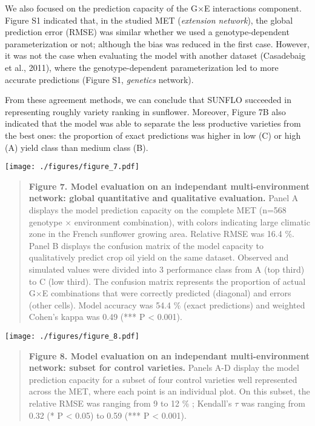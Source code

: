 \documentclass[a4paper]{article}
\begin{document}
We also focused on the prediction capacity of the G\(\times\)E
interactions component. Figure S1 indicated that, in the studied MET
(\emph{extension network}), the global prediction error (RMSE) was
similar whether we used a genotype-dependent parameterization or not;
although the bias was reduced in the first case. However, it was not the
case when evaluating the model with another dataset (Casadebaig et al.,
2011), where the genotype-dependent parameterization led to more
accurate predictions (Figure S1, \emph{genetics} network).

From these agreement methods, we can conclude that SUNFLO succeeded in
representing roughly variety ranking in sunflower. Moreover, Figure 7B
also indicated that the model was able to separate the less productive
varieties from the best ones: the proportion of exact predictions was
higher in low (C) or high (A) yield class than medium class (B).

\texttt{[image: ./figures/figure\_7.pdf]}

\begin{quote}
\textbf{Figure 7. Model evaluation on an independant multi-environment
network: global quantitative and qualitative evaluation.} Panel A
displays the model prediction capacity on the complete MET (n=568
genotype \(\times\) environment combination), with colors indicating
large climatic zone in the French sunflower growing area. Relative RMSE
was 16.4 \%. Panel B displays the confusion matrix of the model capacity
to qualitatively predict crop oil yield on the same dataset. Observed
and simulated values were divided into 3 performance class from A (top
third) to C (low third). The confusion matrix represents the proportion
of actual G\(\times\)E combinations that were correctly predicted
(diagonal) and errors (other cells). Model accuracy was 54.4 \% (exact
predictions) and weighted Cohen's kappa was 0.49 (*** P \textless{}
0.001).
\end{quote}

\texttt{[image: ./figures/figure\_8.pdf]}

\begin{quote}
\textbf{Figure 8. Model evaluation on an independant multi-environment
network: subset for control varieties.} Panels A-D display the model
prediction capacity for a subset of four control varieties well
represented across the MET, where each point is an individual plot. On
this subset, the relative RMSE was ranging from 9 to 12 \% ; Kendall's
\(\tau\) was ranging from 0.32 (* P \textless{} 0.05) to 0.59 (*** P
\textless{} 0.001).
\end{quote}
\end{document}
